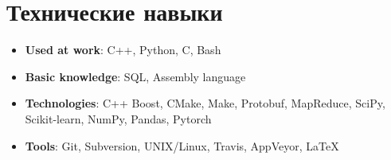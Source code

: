 \documentclass[letterpaper,11pt]{article}
\newcommand{\resumeItem}[2]{
  \item\small{
    \textbf{#1}{: #2 \vspace{-2pt}}
  }
}
\newcommand{\resumeSubItem}[2]{\resumeItem{#1}{#2}\vspace{-4pt}}
\newcommand{\resumeSubHeadingListStart}{\begin{itemize}[leftmargin=*]}
\newcommand{\resumeSubHeadingListEnd}{\end{itemize}}
\begin{document}
\section{Технические навыки}
  \resumeSubHeadingListStart
    \resumeSubItem{Used at work}{C++, Python, C, Bash}
    \resumeSubItem{Basic knowledge}{SQL, Assembly language}
    \resumeSubItem{Technologies}{C++ Boost, CMake, Make, Protobuf, MapReduce, SciPy, Scikit-learn, NumPy, Pandas, Pytorch}
    \resumeSubItem{Tools}{Git, Subversion, UNIX/Linux, Travis, AppVeyor, \LaTeX}
  \resumeSubHeadingListEnd



\end{document}
